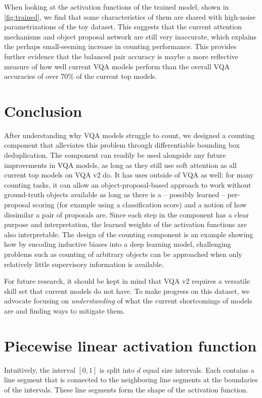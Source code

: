 \documentclass[letterpaper]{article}
\begin{document}
When looking at the activation functions of the trained model, shown in \autoref{fig:trained}, we find that some characteristics of them are shared with high-noise parametrizations of the toy dataset.
This suggests that the current attention mechanisms and object proposal network are still very inaccurate, which explains the perhaps small-seeming increase in counting performance.
This provides further evidence that the balanced pair accuracy is maybe a more reflective measure of how well current VQA models perform than the overall VQA accuracies of over 70\% of the current top models.

\section{Conclusion}\label{sec:conclusion}
After understanding why VQA models struggle to count, we designed a counting component that alleviates this problem through differentiable bounding box deduplication.
The component can readily be used alongside any future improvements in VQA models, as long as they still use soft attention as all current top models on VQA v2 do.
It has uses outside of VQA as well: for many counting tasks, it can allow an object-proposal-based approach to work without ground-truth objects available as long as there is a -- possibly learned -- per-proposal scoring (for example using a classification score) and a notion of how dissimilar a pair of proposals are.
Since each step in the component has a clear purpose and interpretation, the learned weights of the activation functions are also interpretable.
The design of the counting component is an example showing how by encoding inductive biases into a deep learning model, challenging problems such as counting of arbitrary objects can be approached when only relatively little supervisory information is available.

For future research, it should be kept in mind that VQA v2 requires a versatile skill set that current models do not have.
To make progress on this dataset, we advocate focusing on \emph{understanding} of what the current shortcomings of models are and finding ways to mitigate them.





\newpage
\appendix


\section{Piecewise linear activation function}\label{app:plin}
Intuitively, the interval $[0, 1]$ is split into $d$ equal size intervals.
Each contains a line segment that is connected to the neighboring line segments at the boundaries of the intervals.
These line segments form the shape of the activation function.
\end{document}
